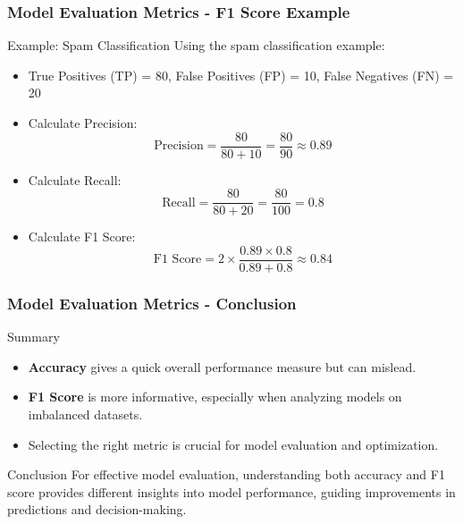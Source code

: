 \documentclass[aspectratio=169]{beamer}
\begin{document}
\begin{frame}[fragile]
    \frametitle{Model Evaluation Metrics - F1 Score Example}
    \begin{block}{Example: Spam Classification}
        Using the spam classification example:
        \begin{itemize}
            \item True Positives (TP) = 80, False Positives (FP) = 10, False Negatives (FN) = 20
            \item Calculate Precision:
                \begin{equation}
                \text{Precision} = \frac{80}{80 + 10} = \frac{80}{90} \approx 0.89
                \end{equation}
            \item Calculate Recall:
                \begin{equation}
                \text{Recall} = \frac{80}{80 + 20} = \frac{80}{100} = 0.8
                \end{equation}
            \item Calculate F1 Score:
                \begin{equation}
                \text{F1 Score} = 2 \times \frac{0.89 \times 0.8}{0.89 + 0.8} \approx 0.84
                \end{equation}
        \end{itemize}
    \end{block}
\end{frame}

\begin{frame}[fragile]
    \frametitle{Model Evaluation Metrics - Conclusion}
    \begin{block}{Summary}
        \begin{itemize}
            \item \textbf{Accuracy} gives a quick overall performance measure but can mislead.
            \item \textbf{F1 Score} is more informative, especially when analyzing models on imbalanced datasets.
            \item Selecting the right metric is crucial for model evaluation and optimization.
        \end{itemize}
    \end{block}
    \begin{block}{Conclusion}
        For effective model evaluation, understanding both accuracy and F1 score provides different insights into model performance, guiding improvements in predictions and decision-making.
    \end{block}
\end{frame}
\end{document}
